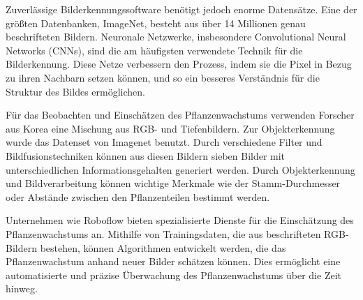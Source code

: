 Zuverlässige Bilderkennungssoftware benötigt jedoch enorme Datensätze. Eine der größten Datenbanken, ImageNet, besteht aus über 14 Millionen genau beschrifteten Bildern. Neuronale Netzwerke, insbesondere Convolutional Neural Networks (CNNs), sind die am häufigsten verwendete Technik für die Bilderkennung.\cite{mansi2023ml-image-recognition} Diese Netze verbessern den Prozess, indem sie die Pixel in Bezug zu ihren Nachbarn setzen können, und so ein besseres Verständnis für die Struktur des Bildes ermöglichen.\cite{ibm-cnn}

Für das Beobachten und Einschätzen des Pflanzenwachstums verwenden Forscher aus Korea eine Mischung aus RGB- und Tiefenbildern.\cite{cho2023plant} Zur Objekterkennung wurde das Datenset von Imagenet benutzt. Durch verschiedene Filter und Bildfusionstechniken können aus diesen Bildern sieben Bilder mit unterschiedlichen Informationsgehalten generiert werden. Durch Objekterkennung und Bildverarbeitung können wichtige Merkmale wie der Stamm-Durchmesser oder Abstände zwischen den Pflanzenteilen bestimmt werden.

Unternehmen wie Roboflow bieten spezialisierte Dienste für die Einschätzung des Pflanzenwachstums an.\cite{roboflow_plant_growth} Mithilfe von Trainingsdaten, die aus beschrifteten RGB-Bildern bestehen, können Algorithmen entwickelt werden, die das Pflanzenwachstum anhand neuer Bilder schätzen können. Dies ermöglicht eine automatisierte und präzise Überwachung des Pflanzenwachstums über die Zeit hinweg.
